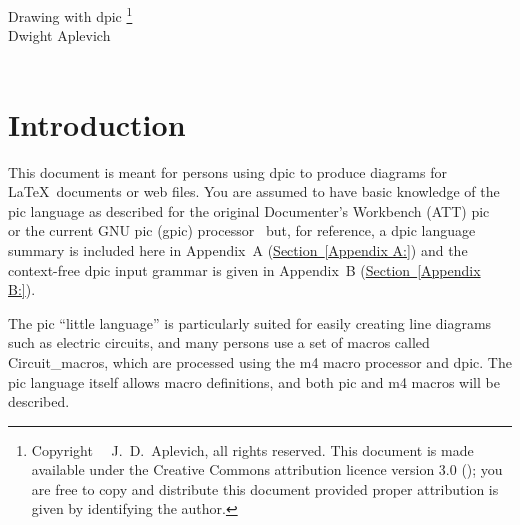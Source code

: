 \documentclass[11pt]{article}
\newcommand{\bq}{}
\newcommand{\Dpic}{{\bq Dpic}\xspace}
\newcommand{\dpic}{{\bq dpic}\xspace}
\newcommand{\SR}[1]{\hyperref[#1]{Section~\ref*{#1}}}
\begin{document}
%
\begin{centering}
{\LARGE Drawing with dpic}%
\footnote{Copyright \textcopyright\ \the\year\ J.\ D.\ Aplevich,
  all rights reserved.  This document is made available
  under the Creative Commons attribution licence version 3.0
  ();
  you are free to copy
  and distribute this document provided proper attribution is given by
  identifying the author.
}\\
{\large
Dwight Aplevich}\\
\\
\end{centering}

%
\begin{multicols}{2}
\tableofcontents
\end{multicols}
\section{Introduction}

This document is meant for persons using dpic to produce diagrams for
\LaTeX\ documents or web files.  You are assumed to have basic knowledge
of the pic language as described for the original Documenter's
Workbench (ATT) pic~\cite{KRpic} or the
current GNU pic (gpic) processor~\cite{Raymond95} but,
for reference, a dpic language summary is included here in
Appendix~A (\SR{Appendix A:})
and the context-free dpic input grammar is given in
Appendix~B (\SR{Appendix B:}).

The pic ``little language'' is particularly suited for easily creating
line diagrams such as electric circuits, and many persons use a set of
macros called Circuit\_macros, which are processed using the m4 macro
processor and \dpic.  The pic language itself allows macro definitions,
and both pic and m4 macros will be described.
\end{document}
